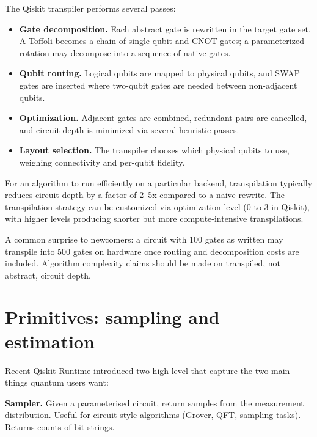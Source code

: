 The Qiskit transpiler performs several passes:

\begin{itemize}
  \item \textbf{Gate decomposition.} Each abstract gate is rewritten in the target gate set. A Toffoli becomes a chain of single-qubit and CNOT gates; a parameterized rotation may decompose into a sequence of native gates.
  \item \textbf{Qubit routing.} Logical qubits are mapped to physical qubits, and SWAP gates are inserted where two-qubit gates are needed between non-adjacent qubits.
  \item \textbf{Optimization.} Adjacent gates are combined, redundant pairs are cancelled, and circuit depth is minimized via several heuristic passes.
  \item \textbf{Layout selection.} The transpiler chooses which physical qubits to use, weighing connectivity and per-qubit fidelity.
\end{itemize}

For an algorithm to run efficiently on a particular backend, transpilation typically reduces circuit depth by a factor of 2--5x compared to a naive rewrite. The transpilation strategy can be customized via optimization level (0 to 3 in Qiskit), with higher levels producing shorter but more compute-intensive transpilations.

\begin{remark}
A common surprise to newcomers: a circuit with 100 gates as written may transpile into 500 gates on hardware once routing and decomposition costs are included. Algorithm complexity claims should be made on transpiled, not abstract, circuit depth.
\end{remark}

\section{Primitives: sampling and estimation}

Recent Qiskit Runtime introduced two high-level  that capture the two main things quantum users want:

\textbf{Sampler.} Given a parameterised circuit, return samples from the measurement distribution. Useful for circuit-style algorithms (Grover, QFT, sampling tasks). Returns counts of bit-strings.

